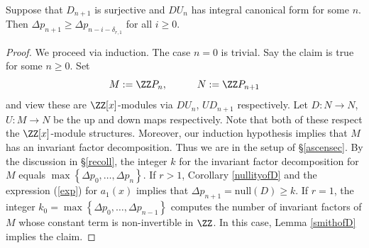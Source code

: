 \begin{proposition} \label{conjequiv}  Suppose that $ D_{n+1} $ is surjective and  $ DU_{n}  $ has integral canonical form for some $ n $.    Then $\Delta p_{n+1}  \geq \Delta p_{n-i-\delta_{r,1} }  $
for all $ i  \geq  0  $.    
\end{proposition}  


\begin{proof} We proceed via  induction.  
The case $ n = 0 $ is trivial. Say the claim is true for some $ n \geq 0 $.    
Set $$ M :   =  \ZZ P _{n }, \quad   \quad  \quad    N  :    =  \ZZ    P_{n+1} $$ and view these are $  \ZZ  [   x] $-modules via $ DU_{n} $, $ UD_{n+1} $ respectively.  Let  $ D : N \to N $, $ U : M \to N $ be the up and down maps respectively. Note that both of these respect the $\ZZ[x]$-module structures. Moreover, our induction hypothesis implies that $ M $ has an invariant factor decomposition. Thus we are in the setup of \S \ref{ascensec}.  By the discussion in \S \ref{recoll}, the integer $ k $ for the invariant factor decomposition for $ M $ equals  $ \max \left \{ \Delta p_{0}, \ldots, \Delta p_{n}  \right \}  $.   If $ r >  1  $, Corollary \ref{nullityofD} and the expression (\ref{exp}) for $ a_{1}(x) $ implies that $ \Delta p_{n+1} = \mathrm{null}(D)  \geq k $.  If $ r = 1 $, the integer $ k_{0} = \max \left \{ \Delta p_{0}, \ldots, \Delta p_{n-1} \right \} $ computes the number of invariant factors of $ M $ whose constant term is non-invertible in $ \ZZ  $. In this case, Lemma \ref{smithofD} implies the claim. 
 \end{proof} 
 

